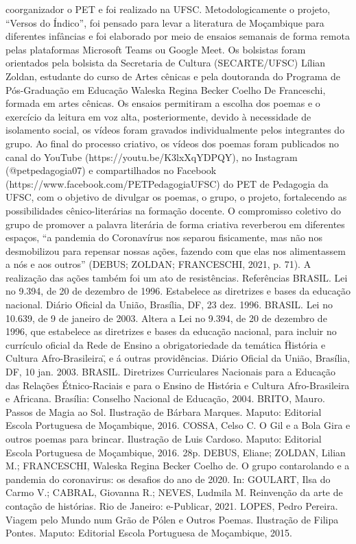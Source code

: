 coorganizador o PET e foi realizado na UFSC.
Metodologicamente o projeto, “Versos do Índico”, foi pensado para levar a literatura de 
Moçambique para diferentes infâncias e foi elaborado por meio de ensaios semanais de forma 
remota pelas plataformas Microsoft Teams ou Google Meet. Os bolsistas foram orientados pela 
bolsista da Secretaria de Cultura (SECARTE/UFSC) Lílian Zoldan, estudante do curso de Artes 
cênicas e pela doutoranda do Programa de Pós-Graduação em Educação Waleska Regina Becker 
Coelho De Franceschi, formada em artes cênicas. Os ensaios permitiram a escolha dos poemas e
o exercício da leitura em voz alta, posteriormente, devido à necessidade de isolamento social, os 
vídeos foram gravados individualmente pelos integrantes do grupo. Ao final do processo criativo, 
os vídeos dos poemas foram publicados no canal do YouTube (https://youtu.be/K3lxXqYDPQY), 
no Instagram (@petpedagogia07) e compartilhados no Facebook
(https://www.facebook.com/PETPedagogiaUFSC) do PET de Pedagogia da UFSC, com o 
objetivo de divulgar os poemas, o grupo, o projeto, fortalecendo as possibilidades cênico-literárias 
na formação docente.
O compromisso coletivo do grupo de promover a palavra literária de forma criativa 
reverberou em diferentes espaços, “a pandemia do Coronavírus nos separou fisicamente, mas não 
nos desmobilizou para repensar nossas ações, fazendo com que elas nos alimentassem a nós e aos 
outros” (DEBUS; ZOLDAN; FRANCESCHI, 2021, p. 71). A realização das ações também foi um 
ato de resistências.
Referências
BRASIL. Lei no
9.394, de 20 de dezembro de 1996. Estabelece as diretrizes e bases da educação 
nacional. Diário Oficial da União, Brasília, DF, 23 dez. 1996.
BRASIL. Lei no
10.639, de 9 de janeiro de 2003. Altera a Lei no 9.394, de 20 de dezembro de 
1996, que estabelece as diretrizes e bases da educação nacional, para incluir no currículo oficial 
da Rede de Ensino a obrigatoriedade da temática \"História e Cultura Afro-Brasileira\", e á outras 
providências. Diário Oficial da União, Brasília, DF, 10 jan. 2003.
BRASIL. Diretrizes Curriculares Nacionais para a Educação das Relações Étnico-Raciais e 
para o Ensino de História e Cultura Afro-Brasileira e Africana. Brasília: Conselho Nacional 
de Educação, 2004.
BRITO, Mauro. Passos de Magia ao Sol. Ilustração de Bárbara Marques. Maputo: Editorial 
Escola Portuguesa de Moçambique, 2016. 
COSSA, Celso C. O Gil e a Bola Gira e outros poemas para brincar. Ilustração de Luis Cardoso. 
Maputo: Editorial Escola Portuguesa de Moçambique, 2016. 28p. 
DEBUS, Eliane; ZOLDAN, Lilian M.; FRANCESCHI, Waleska Regina Becker Coelho de. O 
grupo contarolando e a pandemia do coronavirus: os desafios do ano de 2020. In: GOULART, Ilsa 
do Carmo V.; CABRAL, Giovanna R.; NEVES, Ludmila M. Reinvenção da arte de contação de 
histórias. Rio de Janeiro: e-Publicar, 2021. 
LOPES, Pedro Pereira. Viagem pelo Mundo num Grão de Pólen e Outros Poemas. Ilustração 
de Filipa Pontes. Maputo: Editorial Escola Portuguesa de Moçambique, 2015.


